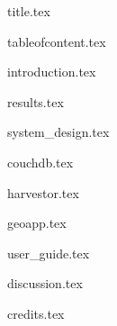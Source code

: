 \documentclass[a4paper, 11pt]{article}
\begin{document}
\thispagestyle{empty}
\thispagestyle{empty}

{title.tex}

{tableofcontent.tex}

\listoffigures
\newpage

\setcounter{page}{1}

{introduction.tex}

{results.tex}

{system_design.tex}

{couchdb.tex}

{harvestor.tex}

{geoapp.tex}

{user_guide.tex}

{discussion.tex}

{credits.tex}

\newpage
\printbibliography
 
\end{document}
